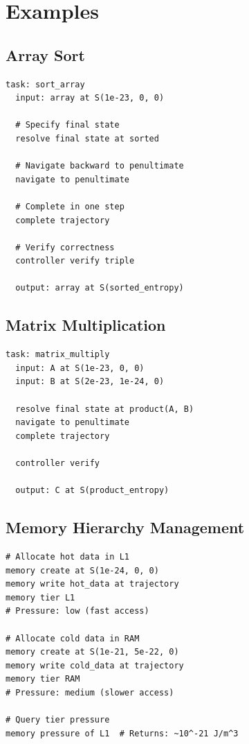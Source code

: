 \documentclass[twocolumn,10pt]{article}
\theoremstyle{definition}
\theoremstyle{remark}
\begin{document}
\section{Examples}
\label{sec:examples}

\subsection{Array Sort}

\begin{lstlisting}[caption={Array sort via trajectory completion}]
task: sort_array
  input: array at S(1e-23, 0, 0)

  # Specify final state
  resolve final state at sorted

  # Navigate backward to penultimate
  navigate to penultimate

  # Complete in one step
  complete trajectory

  # Verify correctness
  controller verify triple

  output: array at S(sorted_entropy)
\end{lstlisting}

\subsection{Matrix Multiplication}

\begin{lstlisting}[caption={Matrix multiplication}]
task: matrix_multiply
  input: A at S(1e-23, 0, 0)
  input: B at S(2e-23, 1e-24, 0)

  resolve final state at product(A, B)
  navigate to penultimate
  complete trajectory

  controller verify

  output: C at S(product_entropy)
\end{lstlisting}

\subsection{Memory Hierarchy Management}

\begin{lstlisting}[caption={Tier-aware memory allocation}]
# Allocate hot data in L1
memory create at S(1e-24, 0, 0)
memory write hot_data at trajectory
memory tier L1
# Pressure: low (fast access)

# Allocate cold data in RAM
memory create at S(1e-21, 5e-22, 0)
memory write cold_data at trajectory
memory tier RAM
# Pressure: medium (slower access)

# Query tier pressure
memory pressure of L1  # Returns: ~10^-21 J/m^3
\end{lstlisting}
\end{document}
